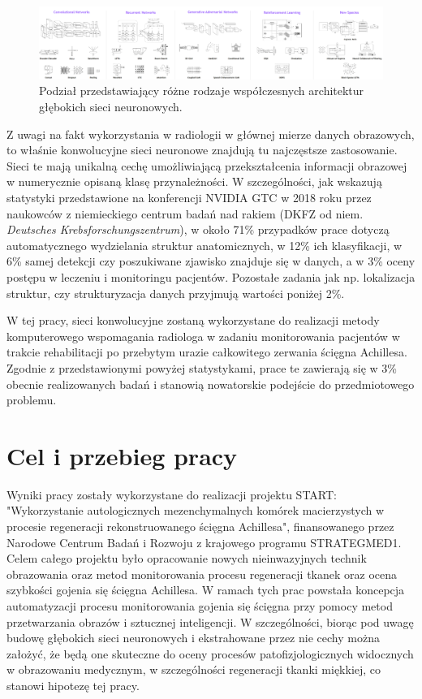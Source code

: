 \begin{figure}[h!]
	\centering
	\includegraphics[width=1.0\textwidth]{figures/rodzajeSieciNeuronowych.png}
	\caption{Podział przedstawiający różne rodzaje współczesnych architektur głębokich sieci neuronowych.}
	\label{DLcambrianExplosion}
\end{figure}

Z uwagi na fakt wykorzystania w radiologii w głównej mierze danych obrazowych, to właśnie konwolucyjne sieci neuronowe znajdują tu najczęstsze zastosowanie. Sieci te mają unikalną cechę umożliwiającą przekształcenia informacji obrazowej w numerycznie opisaną klasę przynależności. W szczególności, jak wskazują statystyki przedstawione na konferencji NVIDIA GTC w 2018 roku przez naukowców z niemieckiego centrum badań nad rakiem (DKFZ od niem. \textit{Deutsches Krebsforschungszentrum}), w około 71\% przypadków prace dotyczą automatycznego wydzielania struktur anatomicznych, w 12\% ich klasyfikacji, w 6\% samej detekcji czy poszukiwane zjawisko znajduje się w danych, a w 3\% oceny postępu w leczeniu i monitoringu pacjentów. Pozostałe zadania jak np. lokalizacja struktur, czy strukturyzacja danych przyjmują wartości poniżej 2\%.

W tej pracy, sieci konwolucyjne zostaną wykorzystane do realizacji metody komputerowego wspomagania radiologa w zadaniu monitorowania pacjentów w trakcie rehabilitacji po przebytym urazie całkowitego zerwania ścięgna Achillesa. Zgodnie z przedstawionymi powyżej statystykami, prace te zawierają się w 3\% obecnie realizowanych badań i stanowią nowatorskie podejście do przedmiotowego problemu.


\chapter{Cel i przebieg pracy}

Wyniki pracy zostały wykorzystane do realizacji projektu START: "Wykorzystanie autologicznych mezenchymalnych komórek macierzystych w procesie regeneracji rekonstruowanego ścięgna Achillesa", finansowanego przez Narodowe Centrum Badań i Rozwoju z krajowego programu STRATEGMED1. Celem całego projektu było opracowanie nowych nieinwazyjnych technik obrazowania oraz metod monitorowania procesu regeneracji tkanek oraz ocena szybkości gojenia się ścięgna Achillesa. W ramach tych prac powstała koncepcja automatyzacji procesu monitorowania gojenia się ścięgna przy pomocy metod przetwarzania obrazów i sztucznej inteligencji. W szczególności, biorąc pod uwagę budowę głębokich sieci neuronowych i ekstrahowane przez nie cechy można założyć, że będą one skuteczne do oceny procesów patofizjologicznych widocznych w obrazowaniu medycznym, w szczególności regeneracji tkanki miękkiej, co stanowi hipotezę tej pracy.

